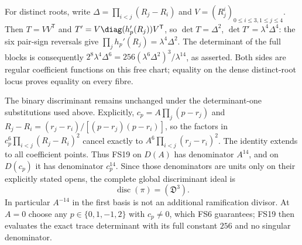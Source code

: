 For distinct roots, write
$\Delta=\prod_{i<j}(R_j-R_i)$ and
$V=(R_j^i)_{0\le i\le3,1\le j\le4}$.
Then $T=VV^{\mathsf T}$ and
$T'=V\diag(h_p'(R_j))V^{\mathsf T}$, so
$\det T=\Delta^2$, $\det T'=\lambda^4\Delta^4$:
the six pair-sign reversals give
$\prod_j h_p'(R_j)=\lambda^4\Delta^2$.
The determinant of the full blocks is consequently
$2^8\lambda^4\Delta^6
=256(\lambda^6\Delta^2)^3/\lambda^{14}$, as asserted.
Both sides are regular coefficient functions on this free
chart; equality on the dense distinct-root locus proves
equality on every fibre.

The binary discriminant remains unchanged under the
determinant-one substitutions used above. Explicitly,
$c_p=A\prod_j(p-r_j)$ and
$R_j-R_i=(r_j-r_i)/[(p-r_j)(p-r_i)]$, so the factors
in $c_p^6\prod_{i<j}(R_j-R_i)^2$ cancel exactly to
$A^6\prod_{i<j}(r_j-r_i)^2$. The identity extends to all
coefficient points. Thus FS19 on $D(A)$ has denominator
$A^{14}$, and on $D(c_p)$ it has denominator $c_p^{14}$.
Since those denominators are units only on their explicitly
stated opens, the complete global discriminant ideal is
\begin{equation}
\operatorname{disc}(\pi)=(\mathfrak D^3).
\tag{FS20}
\end{equation}
In particular $A^{-14}$ in the first basis is not an
additional ramification divisor. At $A=0$ choose any
$p\in\{0,1,-1,2\}$ with $c_p\ne0$, which FS6 guarantees;
FS19 then evaluates the exact trace determinant with its
full constant $256$ and no singular denominator.

